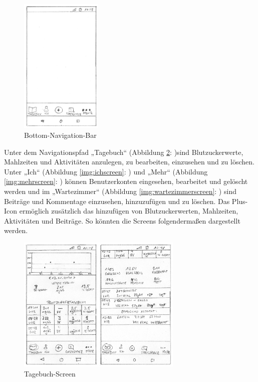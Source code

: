 \begin{figure}[H]
	\centering
	\includegraphics[width=0.35\textwidth]{images/navigationbar.png}
	\captionsetup{justification=centering}
	\caption{Bottom-Navigation-Bar}
	\label{img:navigationbar}
\end{figure}
Unter dem Navigationspfad „Tagebuch“ (Abbildung \ref{img:tagebuchscreen}: )sind Blutzuckerwerte, Mahlzeiten und Aktivitäten anzulegen, zu bearbeiten, einzusehen und zu löschen. Unter „Ich“ (Abbildung \ref{img:ichscreen}: ) und „Mehr“ (Abbildung \ref{img:mehrscreen}: ) können Benutzerkonten eingesehen, bearbeitet und gelöscht werden und im „Wartezimmer“ (Abbildung \ref{img:wartezimmerscreen}: ) sind Beiträge und Kommentage einzusehen, hinzuzufügen und zu löschen. Das Plus-Icon ermöglich zusätzlich das hinzufügen von Blutzuckerwerten, Mahlzeiten, Aktivitäten und Beiträge. So könnten die Screens folgendermaßen dargestellt werden. 
\begin{figure}[H]
	\centering
	\includegraphics[width=0.7\textwidth]{images/tagebuchscreen.png}
	\captionsetup{justification=centering}
	\caption{Tagebuch-Screen}
	\label{img:tagebuchscreen}
\end{figure}
